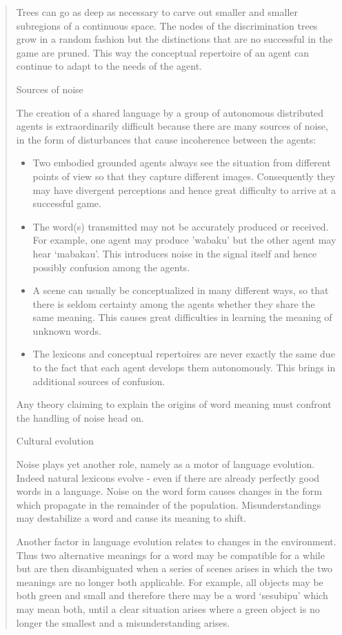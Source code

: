 \begin{quotation}
Trees can go as deep as necessary to carve out smaller and smaller subregions of a continuous space. The nodes
of the discrimination trees grow in a random fashion but the distinctions that are no successful in the game are 
pruned. This way the conceptual repertoire of an agent can continue to adapt to the needs of the agent. 

\noindent
{\bfshape Sources of noise}

The creation of a shared language by a group of autonomous distributed agents is extraordinarily difficult 
because there are many sources of noise, in the form of disturbances that cause incoherence between the agents: 
\begin{itemize} 
\item Two embodied grounded agents always see the situation from different points of view so that they capture 
different images. Consequently they may have divergent perceptions and hence great difficulty to arrive at a 
successful game. 
\item The word(s) transmitted may not be accurately produced or received. For example, one agent may produce 
'wabaku' but the other agent may hear `mabakau'. This introduces noise in the signal itself and hence 
possibly confusion among the agents. 
\item A scene can usually be conceptualized in many different ways, so that there is seldom certainty among 
the agents whether they share the same meaning. This causes great difficulties in learning 
the meaning of unknown words. 
\item The lexicons and conceptual repertoires are never exactly the same due to the fact that each agent
develops them autonomously. This brings in additional sources of confusion. 
\end{itemize}
Any theory claiming to explain the origins of word meaning must confront the handling of 
noise head on. 

\noindent
{\bfshape Cultural evolution}

\noindent
Noise plays yet another role, namely as a motor of language evolution. Indeed natural lexicons evolve - 
even if there are already perfectly good words in a language. Noise on the word form causes changes 
in the form which propagate in the remainder of the population. Misunderstandings may destabilize a
word and cause its meaning to shift. 

Another factor in language evolution relates to changes in the environment. Thus two alternative 
meanings for a word may be compatible for a while but are then disambiguated when a series of scenes
arises in which the two meanings are no longer both applicable. For example, all objects may be both 
green and small and therefore there may be a word `sesubipu' which may mean both, until a clear 
situation arises where a green object is no longer the smallest and a misunderstanding arises. 
\end{quotation}

